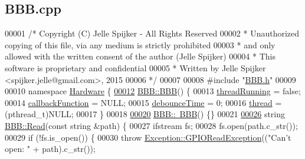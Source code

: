 \hypertarget{_b_b_b_8cpp_source}{}\subsection{B\+B\+B.\+cpp}
\label{_b_b_b_8cpp_source}

\begin{DoxyCode}
00001 \textcolor{comment}{/* Copyright (C) Jelle Spijker - All Rights Reserved}
00002 \textcolor{comment}{ * Unauthorized copying of this file, via any medium is strictly prohibited}
00003 \textcolor{comment}{ * and only allowed with the written consent of the author (Jelle Spijker)}
00004 \textcolor{comment}{ * This software is proprietary and confidential}
00005 \textcolor{comment}{ * Written by Jelle Spijker <spijker.jelle@gmail.com>, 2015}
00006 \textcolor{comment}{ */}
00007 
00008 \textcolor{preprocessor}{#include "\hyperlink{_b_b_b_8h}{BBB.h}"}
00009 
00010 \textcolor{keyword}{namespace }\hyperlink{namespace_hardware}{Hardware} \{
\hypertarget{_b_b_b_8cpp_source_l00012}{}\hyperlink{class_hardware_1_1_b_b_b_ab26c0f13cc9488b757e309495ef398d7}{00012} \hyperlink{class_hardware_1_1_b_b_b_ab26c0f13cc9488b757e309495ef398d7}{BBB::BBB}() \{
00013   \hyperlink{class_hardware_1_1_b_b_b_a0d9d8c56afb37955e0d0c6baf0f418df}{threadRunning} = \textcolor{keyword}{false};
00014   \hyperlink{class_hardware_1_1_b_b_b_a66d583952f3949a732ee15eea81e80e5}{callbackFunction} = NULL;
00015   \hyperlink{class_hardware_1_1_b_b_b_a353a2d7d4fbade337e5173b484b20b22}{debounceTime} = 0;
00016   \hyperlink{class_hardware_1_1_b_b_b_a3ad3fe886705bfc242ef58dc5329166e}{thread} = (pthread\_t)NULL;
00017 \}
00018 
\hypertarget{_b_b_b_8cpp_source_l00020}{}\hyperlink{class_hardware_1_1_b_b_b_a34ee1e17e06e6d229be6d718b9ad1f02}{00020} \hyperlink{class_hardware_1_1_b_b_b_a34ee1e17e06e6d229be6d718b9ad1f02}{BBB::~BBB}() \{\}
00021 
\hypertarget{_b_b_b_8cpp_source_l00026}{}\hyperlink{class_hardware_1_1_b_b_b_a8b287ded7bcb2cfab361d1fca2b62e9f}{00026} \textcolor{keywordtype}{string} \hyperlink{class_hardware_1_1_b_b_b_a8b287ded7bcb2cfab361d1fca2b62e9f}{BBB::Read}(\textcolor{keyword}{const} \textcolor{keywordtype}{string} &path) \{
00027   ifstream fs;
00028   fs.open(path.c\_str());
00029   \textcolor{keywordflow}{if} (!fs.is\_open()) \{
00030     \textcolor{keywordflow}{throw} \hyperlink{class_hardware_1_1_exception_1_1_g_p_i_o_read_exception}{Exception::GPIOReadException}((\textcolor{stringliteral}{"Can't open: "} + path).c\_str());

\end{DoxyCode}
